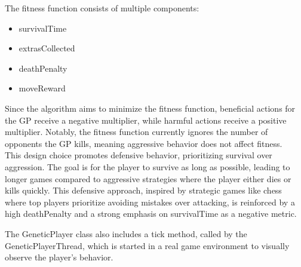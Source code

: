 \documentclass[sigconf]{acmart} %
\begin{document}
The fitness function consists of multiple components: 
\begin{itemize}
      \item survivalTime 
      \item extrasCollected 
      \item deathPenalty 
      \item moveReward 
\end{itemize}

Since the algorithm aims to minimize the fitness function, beneficial actions for the GP receive a negative multiplier, while harmful actions receive a positive multiplier. Notably, the fitness function currently ignores the number of opponents the GP kills, meaning aggressive behavior does not affect fitness. \\
This design choice promotes defensive behavior, prioritizing survival over aggression. The goal is for the player to survive as long as possible, leading to longer games compared to aggressive strategies where the player either dies or kills quickly. This defensive approach, inspired by strategic games like chess where top players prioritize avoiding mistakes over attacking, is reinforced by a high deathPenalty and a strong emphasis on survivalTime as a negative metric.

The GeneticPlayer class also includes a tick method, called by the GeneticPlayerThread, which is started in a real game environment to visually observe the player's behavior. 
\end{document}
